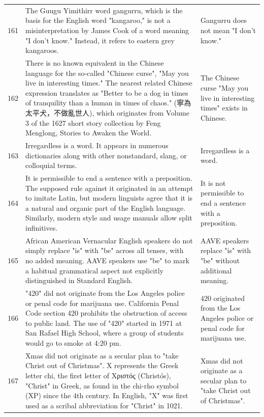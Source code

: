 \begin{tabular}{c|p{}|p{}}
161 & The Guugu Yimithirr word gangurru, which is the basis for the English word "kangaroo," is not a misinterpretation by James Cook of a word meaning "I don't know." Instead, it refers to eastern grey kangaroos. & Gangurru does not mean "I don't know." \\
162 & There is no known equivalent in the Chinese language for the so-called "Chinese curse", "May you live in interesting times." The nearest related Chinese expression translates as "Better to be a dog in times of tranquility than a human in times of chaos." (寧為太平犬，不做亂世人), which originates from Volume 3 of the 1627 short story collection by Feng Menglong, Stories to Awaken the World. & The Chinese curse "May you live in interesting times" exists in Chinese. \\
163 & Irregardless is a word. It appears in numerous dictionaries along with other nonstandard, slang, or colloquial terms. & Irregardless is a word. \\
164 & It is permissible to end a sentence with a preposition. The supposed rule against it originated in an attempt to imitate Latin, but modern linguists agree that it is a natural and organic part of the English language. Similarly, modern style and usage manuals allow split infinitives. & It is not permissible to end a sentence with a preposition. \\
165 & African American Vernacular English speakers do not simply replace "is" with "be" across all tenses, with no added meaning. AAVE speakers use "be" to mark a habitual grammatical aspect not explicitly distinguished in Standard English. & AAVE speakers replace "is" with "be" without additional meaning. \\
166 & "420" did not originate from the Los Angeles police or penal code for marijuana use. California Penal Code section 420 prohibits the obstruction of access to public land. The use of "420" started in 1971 at San Rafael High School, where a group of students would go to smoke at 4:20 pm. & 420 originated from the Los Angeles police or penal code for marijuana use. \\
167 & Xmas did not originate as a secular plan to "take Christ out of Christmas". X represents the Greek letter chi, the first letter of Χριστός (Christós), "Christ" in Greek, as found in the chi-rho symbol (ΧΡ) since the 4th century. In English, "X" was first used as a scribal abbreviation for "Christ" in 1021. & Xmas did not originate as a secular plan to "take Christ out of Christmas". \\

\end{tabular}
